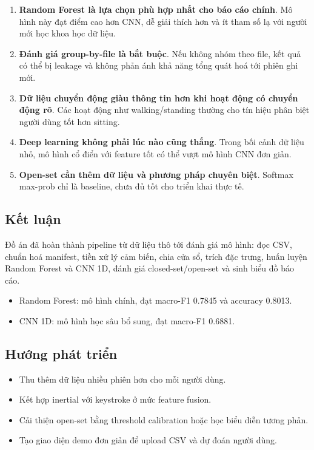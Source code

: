 \documentclass[12pt,a4paper]{article}
\begin{document}
\begin{enumerate}
    \item \textbf{Random Forest là lựa chọn phù hợp nhất cho báo cáo chính}. Mô hình này đạt điểm cao hơn CNN, dễ giải thích hơn và ít tham số lạ với người mới học khoa học dữ liệu.
    \item \textbf{Đánh giá group-by-file là bắt buộc}. Nếu không nhóm theo file, kết quả có thể bị leakage và không phản ánh khả năng tổng quát hoá tới phiên ghi mới.
    \item \textbf{Dữ liệu chuyển động giàu thông tin hơn khi hoạt động có chuyển động rõ}. Các hoạt động như walking/standing thường cho tín hiệu phân biệt người dùng tốt hơn sitting.
    \item \textbf{Deep learning không phải lúc nào cũng thắng}. Trong bối cảnh dữ liệu nhỏ, mô hình cổ điển với feature tốt có thể vượt mô hình CNN đơn giản.
    \item \textbf{Open-set cần thêm dữ liệu và phương pháp chuyên biệt}. Softmax max-prob chỉ là baseline, chưa đủ tốt cho triển khai thực tế.
\end{enumerate}

\subsection{Kết luận}

Đồ án đã hoàn thành pipeline từ dữ liệu thô tới đánh giá mô hình: đọc CSV, chuẩn hoá manifest, tiền xử lý cảm biến, chia cửa sổ, trích đặc trưng, huấn luyện Random Forest và CNN 1D, đánh giá closed-set/open-set và sinh biểu đồ báo cáo.

\begin{itemize}
    \item Random Forest: mô hình chính, đạt macro-F1 0.7845 và accuracy 0.8013.
    \item CNN 1D: mô hình học sâu bổ sung, đạt macro-F1 0.6881.
\end{itemize}

\subsection{Hướng phát triển}

\begin{itemize}
    \item Thu thêm dữ liệu nhiều phiên hơn cho mỗi người dùng.
    \item Kết hợp inertial với keystroke ở mức feature fusion.
    \item Cải thiện open-set bằng threshold calibration hoặc học biểu diễn tương phản.
    \item Tạo giao diện demo đơn giản để upload CSV và dự đoán người dùng.
\end{itemize}
\end{document}
